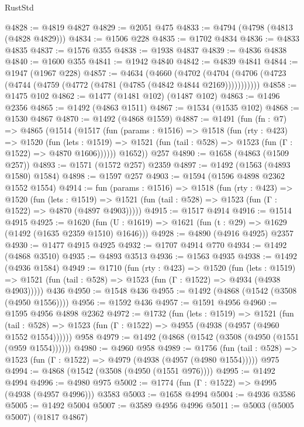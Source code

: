 \begin{lexlean}{RustStd}
\begin{coremodule}
@4828 := @4819 @4827
@4829 := @2051 @475
@4833 := @4794 (@4798 (@4813 (@4828 @4829)))
@4834 := @1506 @228
@4835 := @1702 @4834
@4836 := @4833 @4835
@4837 := @1576 @355
@4838 := @1938 @4837
@4839 := @4836 @4838
@4840 := @1600 @355
@4841 := @1942 @4840
@4842 := @4839 @4841
@4844 := @1947 (@1967 @228)
@4857 := @4634
    (@4660
      (@4702 (@4704 (@4706 (@4723 (@4744 (@4759 (@4772 (@4781 (@4785 (@4842 @4844 @2169)))))))))))
@4858 := @1475 @102
@4862 := @1477 (@1481 @102) (@1487 @102)
@4863 := @1496 @2356
@4865 := @1492 (@4863 @1511)
@4867 := @1534 (@1535 @102)
@4868 := @1530 @4867
@4870 := @1492 (@4868 @1559)
@4887 := @1491
    (fun (fn : @7) =>
    @4865
      (@1514
        (@1517
          (fun (params : @1516) =>
          @1518
            (fun (rty : @423) =>
            @1520
              (fun (lets : @1519) =>
              @1521 (fun (tail : @528) => @1523 (fun (Γ : @1522) => @4870 @1606))))))
        @1652))
    @257
@4890 := @1658 (@4863 (@1509 @257))
@4893 := @1571 (@1572 @257) @2359
@4897 := @1492 (@1563 (@4893 @1580) @1584)
@4898 := @1597 @257
@4903 := @1594 (@1596 @4898 @2362 @1552 @1554)
@4914 := fun (params : @1516) =>
  @1518
    (fun (rty : @423) =>
    @1520
      (fun (lets : @1519) =>
      @1521 (fun (tail : @528) => @1523 (fun (Γ : @1522) => @4870 (@4897 @4903)))))
@4915 := @1517 @4914
@4916 := @1514 @4915
@4925 := @1620 (fun (U : @1619) => @1621 (fun (t : @29) => @1629 (@1492 (@1635 @2359 @1510) @1646)))
@4928 := @4890 (@4916 @4925) @2357
@4930 := @1477 @4915 @4925
@4932 := @1707 @4914 @770
@4934 := @1492 (@4868 @3510)
@4935 := @4893 @3513
@4936 := @1563 @4935
@4938 := @1492 (@4936 @1584)
@4949 := @1710
    (fun (rty : @423) =>
    @1520
      (fun (lets : @1519) =>
      @1521 (fun (tail : @528) => @1523 (fun (Γ : @1522) => @4934 (@4938 @4903)))))
    @436
@4950 := @1548 @436
@4955 := @1492 (@4868 (@1542 (@3508 (@4950 @1556))))
@4956 := @1592 @436
@4957 := @1591 @4956
@4960 := @1595 @4956 @4898 @2362
@4972 := @1732
    (fun (lets : @1519) =>
    @1521
      (fun (tail : @528) => @1523 (fun (Γ : @1522) => @4955 (@4938 (@4957 (@4960 @1552 @1554))))))
    @958
@4979 := @1492 (@4868 (@1542 (@3508 (@4950 (@1551 (@959 @1554))))))
@4980 := @4960 @958
@4989 := @1756
    (fun (tail : @528) => @1523 (fun (Γ : @1522) => @4979 (@4938 (@4957 (@4980 @1554)))))
    @975
@4994 := @4868 (@1542 (@3508 (@4950 (@1551 @976))))
@4995 := @1492 @4994
@4996 := @4980 @975
@5002 := @1774 (fun (Γ : @1522) => @4995 (@4938 (@4957 @4996))) @3583
@5003 := @1658 @4994
@5004 := @4936 @3586
@5005 := @1492 @5004
@5007 := @3589 @4956 @4996
@5011 := @5003 (@5005 @5007) (@1817 @4867)

\end{coremodule}
\end{lexlean}

